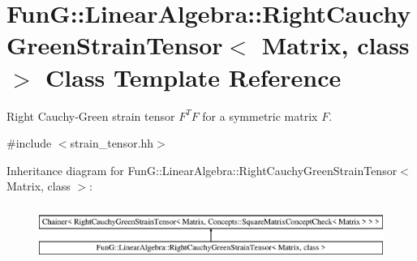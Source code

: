 \hypertarget{classFunG_1_1LinearAlgebra_1_1RightCauchyGreenStrainTensor}{\section{Fun\-G\-:\-:Linear\-Algebra\-:\-:Right\-Cauchy\-Green\-Strain\-Tensor$<$ Matrix, class $>$ Class Template Reference}
\label{classFunG_1_1LinearAlgebra_1_1RightCauchyGreenStrainTensor}
}


Right Cauchy-\/\-Green strain tensor $ F^T F $ for a symmetric matrix $ F $.  




{\ttfamily \#include $<$strain\-\_\-tensor.\-hh$>$}

Inheritance diagram for Fun\-G\-:\-:Linear\-Algebra\-:\-:Right\-Cauchy\-Green\-Strain\-Tensor$<$ Matrix, class $>$\-:\begin{figure}[H]
\begin{center}
\leavevmode
\includegraphics[height=1.830065cm]{classFunG_1_1LinearAlgebra_1_1RightCauchyGreenStrainTensor}
\end{center}
\end{figure}
